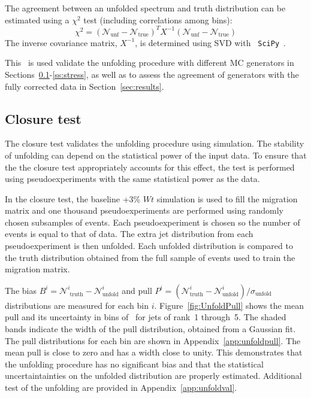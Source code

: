 
The agreement between an unfolded spectrum and truth distribution can be estimated using a $\chi^2$ test (including correlations among bins):
\begin{equation}
\chi^2= \left( {\mathscr N}_{\textrm {unf}}- {\mathscr N}_{\textrm {true}} \right)^{T} X^{-1}\left( {\mathscr N}_{\textrm {unf}}- {\mathscr N}_{\textrm {true}} \right)
\label{eq:unfchi2}
\end{equation}
 The inverse covariance matrix, $X^{-1}$, is determined using SVD with \texttt{ SciPy}~\cite{scipy}.

This \chisq\ is used validate the unfolding procedure with different MC generators in Sections~\ref{ss:close}-\ref{ss:stress}, as well as to assess the agreement of generators with the fully corrected data in Section~\ref{sec:results}.
\subsection{Closure test}
\label{ss:close}
The closure test validates the unfolding procedure using simulation. The stability of unfolding can depend on the statistical power of the input data. To ensure that the the closure test appropriately accounts for this effect, the test is performed using pseudoexperiments with the same statistical power as the data.

In the closure test, the baseline \ttbar+3\% $Wt$ simulation is used to fill the migration matrix and
one thousand pseudoexperiments are performed using randomly chosen subsamples of events.  Each pseudoexperiment is chosen
so the number of events is equal to that of data. 
The extra jet distribution from each pseudoexperiment is then unfolded.  Each unfolded distribution is 
compared to the truth distribution obtained from the full sample of events used to train the migration matrix. 

The bias $B^i={\mathscr N}^i_{\textrm{ truth}}-{\mathscr N}^i_{\textrm{unfold}}$ and 
pull $P^i=({\mathscr N}^i_{\textrm{truth}}-{\mathscr N}^i_{\textrm{unfold}})/\sigma_{\textrm {unfold}}$ 
distributions are measured for each bin $i$. 
Figure~\ref{fig:UnfoldPull} shows the mean pull and its uncertainty in bins of \pT\ for jets of rank~1 through~5.  The shaded bands indicate
the width of the pull distribution, obtained from a Gaussian fit.
The pull distributions for each bin are shown in Appendix~\ref{app:unfoldpull}. 
The mean pull is close to zero and has a width close to unity.  This demonstrates that the unfolding procedure has no 
significant bias and that the statistical uncertaintainties on the unfolded distribution are properly estimated. Additional test of the unfolding are provided in Appendix~\ref{app:unfoldval}. 

